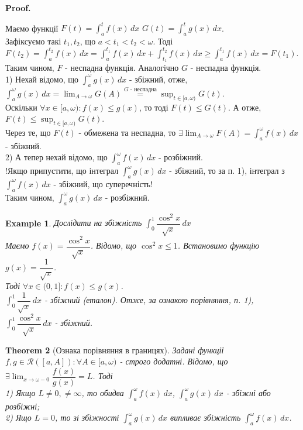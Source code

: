 \documentclass[a4paper, 10pt]{article}
\makeatletter
\def\huge{\displaystyle}
\def\qed{$\blacksquare$}
\theoremstyle{theoremdd}
\newtheorem{theorem}{Theorem}[subsection]
\theoremstyle{theoremdd}
\theoremstyle{theoremdd}
\theoremstyle{theoremdd}
\newtheorem{example}[theorem]{Example}
\theoremstyle{theoremdd}
\theoremstyle{theoremdd}
\theoremstyle{theoremdd}
\theoremstyle{theoremdd}
\renewenvironment{proof}[1][Proof.\\]{\par
\pushQED{\hfill \qed}%
\normalfont \topsep6\p@\@plus6\p@\relax
\trivlist
\item\relax
{\bfseries
#1\@addpunct{.}}\hspace\labelsep\ignorespaces
}{%
\popQED\endtrivlist\@endpefalse
}
\makeatother
\begin{document}
\begin{proof}
Маємо функції $F(t) = \huge\int_a^t f(x)\,dx$ \hspace{0.5cm} $G(t) = \huge\int_a^t g(x)\,dx$.\\
Зафіксуємо такі $t_1,t_2$, що $a < t_1 < t_2 < \omega$. Тоді\\
$F(t_2) = \huge\int_a^{t_2} f(x)\,dx = \huge\int_a^{t_1} f(x)\,dx + \huge\int_{t_1}^{t_2} f(x)\,dx \geq \huge\int_a^{t_1} f(x)\,dx = F(t_1)$.\\
Таким чином, $F$ - неспадна функція. Аналогічно $G$ - неспадна функція.\\
1) Нехай відомо, що $\huge\int_a^\omega g(x)\,dx$ - збіжний, отже,\\
$\huge\int_a^\omega g(x)\,dx = \huge \lim_{A \to \omega} G(A) \overset{G\text{ - неспадна}}{=} \sup_{t \in [a,\omega)} G(t)$.\\
Оскільки $\forall x \in [a,\omega): f(x) \leq g(x)$, то тоді $F(t) \leq G(t)$. А отже, $F(t) \leq \huge \sup_{t \in [a,\omega)} G(t)$.\\
Через те, що $F(t)$ - обмежена та неспадна, то $\huge\exists \lim_{A \to \omega} F(A) = \int_a^\omega f(x)\,dx$ - збіжний.\\
2) А тепер нехай відомо, що $\huge\int_a^\omega f(x)\,dx$ - розбіжний.\\
!Якщо припустити, що інтеграл $\huge\int_a^\omega g(x)\,dx$ - збіжний, то за п. 1), інтеграл з $\huge\int_a^\omega f(x)\,dx$ - збіжний, що суперечність!\\
Таким чином, $\huge\int_a^\omega g(x)\,dx$ - розбіжний.
\end{proof}

\begin{example}
Дослідити на збіжність $\huge\int_0^1 \dfrac{\cos^2 x}{\sqrt{x}}\,dx$\\
Маємо $f(x) = \dfrac{\cos^2 x}{\sqrt{x}}$. Відомо, що $\cos^2 x \leq 1$. Встановимо функцію $g(x) = \dfrac{1}{\sqrt{x}}$.\\Тоді $\forall x \in (0,1]: f(x) \leq g(x)$.\\
$\huge\int_0^1 \dfrac{1}{\sqrt{x}}\,dx$ - збіжний (еталон). Отже, за ознакою порівняння, п. 1), $\huge\int_0^1 \dfrac{\cos^2 x}{\sqrt{x}}\,dx$ - збіжний.
\\
\end{example}

\begin{theorem}[Ознака порівняння в границях]
Задані функції $f,g \in \mathcal{R}([a,A]): \forall A \in [a,\omega)$ - строго додатні. Відомо, що $\exists \huge \lim_{x \to \omega-0} \dfrac{f(x)}{g(x)} = L$. Тоді\\
1) Якщо $L \neq 0, \neq \infty$, то обидва $\huge\int_a^\omega f(x)\,dx$, $\huge\int_a^\omega g(x)\,dx$ - збіжні або розбіжні;\\
2) Ящо $L = 0$, то зі збіжності $\huge\int_a^\omega g(x)\,dx$ випливає збіжність $\huge\int_a^\omega f(x)\,dx$.
\end{theorem}
\end{document}
